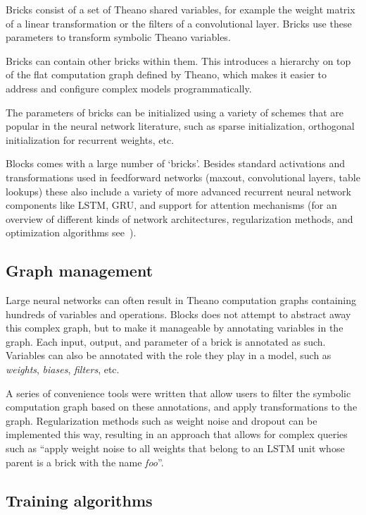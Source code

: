 \documentclass[twoside,11pt]{article}
\begin{document}
Bricks consist of a set of Theano shared variables, for example the weight
matrix of a linear transformation or the filters of a convolutional layer.
Bricks use these parameters to transform symbolic Theano variables.

Bricks can contain other bricks within them. This introduces a hierarchy on top
of the flat computation graph defined by Theano, which makes it easier to
address and configure complex models programmatically.

The parameters of bricks can be initialized using a variety of schemes that are
popular in the neural network literature, such as sparse initialization,
orthogonal initialization for recurrent weights, etc.

Blocks comes with a large number of `bricks'. Besides standard activations and
transformations used in feedforward networks (maxout, convolutional layers,
table lookups) these also include a variety of more advanced recurrent neural
network components like LSTM, GRU, and support for attention mechanisms (for an
overview of different kinds of network architectures, regularization methods,
and optimization algorithms see~\cite{Bengio-et-al-2015-Book}).

\subsection{Graph management}

Large neural networks can often result in Theano computation graphs containing
hundreds of variables and operations. Blocks does not attempt to abstract away
this complex graph, but to make it manageable by annotating variables in the
graph. Each input, output, and parameter of a brick is annotated as such.
Variables can also be annotated with the role they play in a model, such as
\emph{weights}, \emph{biases}, \emph{filters}, etc.

A series of convenience tools were written that allow users to filter the
symbolic computation graph based on these annotations, and apply transformations
to the graph. Regularization methods such as weight noise and dropout can be
implemented this way, resulting in an approach that allows for complex queries
such as ``apply weight noise to all weights that belong to an LSTM unit whose
parent is a brick with the name \emph{foo}''.

\subsection{Training algorithms}
\end{document}
